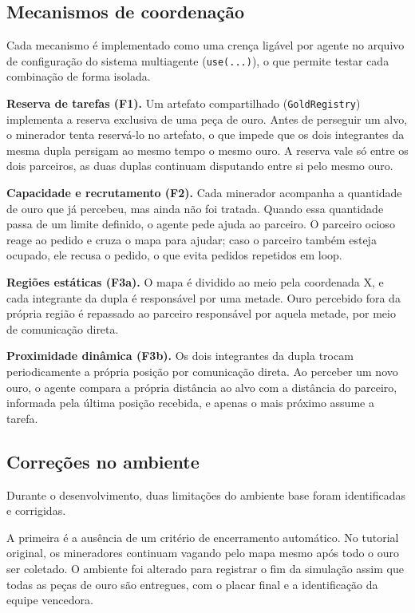 \documentclass{article}
\begin{document}
\subsection{Mecanismos de coordenação}

Cada mecanismo é implementado como uma crença ligável por agente no arquivo
de configuração do sistema multiagente (\texttt{use(...)}), o que permite testar cada
combinação de forma isolada.

\textbf{Reserva de tarefas (F1).} Um artefato compartilhado
(\texttt{GoldRegistry}) implementa a reserva exclusiva de uma peça de ouro.
Antes de perseguir um alvo, o minerador tenta reservá-lo no artefato, o que
impede que os dois integrantes da mesma dupla persigam ao mesmo tempo o
mesmo ouro. A reserva vale só entre os dois parceiros, as duas duplas
continuam disputando entre si pelo mesmo ouro.

\textbf{Capacidade e recrutamento (F2).} Cada minerador acompanha a
quantidade de ouro que já percebeu, mas ainda não foi tratada. Quando essa
quantidade passa de um limite definido, o agente pede ajuda ao parceiro. O
parceiro ocioso reage ao pedido e cruza o mapa para ajudar; caso o parceiro
também esteja ocupado, ele recusa o pedido, o que evita pedidos repetidos em
loop.

\textbf{Regiões estáticas (F3a).} O mapa é dividido ao meio pela coordenada
X, e cada integrante da dupla é responsável por uma metade. Ouro percebido
fora da própria região é repassado ao parceiro responsável por aquela
metade, por meio de comunicação direta.

\textbf{Proximidade dinâmica (F3b).} Os dois integrantes da dupla trocam
periodicamente a própria posição por comunicação direta. Ao perceber um novo
ouro, o agente compara a própria distância ao alvo com a distância do
parceiro, informada pela última posição recebida, e apenas o mais próximo
assume a tarefa.

\subsection{Correções no ambiente}

Durante o desenvolvimento, duas limitações do ambiente base foram
identificadas e corrigidas.

A primeira é a ausência de um critério de encerramento automático. No
tutorial original, os mineradores continuam vagando pelo mapa mesmo após
todo o ouro ser coletado. O ambiente foi alterado para registrar o fim da
simulação assim que todas as peças de ouro são entregues, com o placar final
e a identificação da equipe vencedora.
\end{document}
